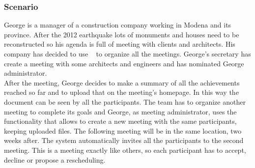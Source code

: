 \subsubsection{Scenario \thecountScenarios }
George is a manager of a construction company working in Modena and its province. After the 2012 earthquake lots of monuments and houses need to be reconstructed so his agenda is full of meeting with clients and architects. His company has decided to use \projectname~ to organize all the meetings. George's secretary has create a meeting with some architects and engineers and has nominated George administrator. \\
After the meeting, George decides to make a summary of all the achievements reached so far and to upload that on the meeting's homepage. In this way the document can be seen by all the participants. The team has to organize another meeting to complete its goals and George, as meeting administrator, uses the \projectname~ functionality that allows to create a new meeting with the same participants, keeping uploaded files. The following meeting will be in the same location, two weeks after. The system automatically invites all the participants to the second meeting. This is a meeting exactly like others, so each participant has to accept, decline or propose a rescheduling.\\

